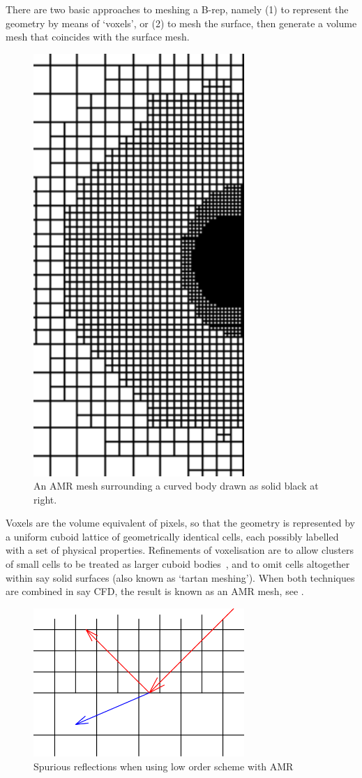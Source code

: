 There are two basic approaches to meshing a B-rep,
namely (1) to represent the geometry by means of `voxels'\cite{Bu07Trea},
or (2) to mesh the surface, then generate a volume mesh that coincides with
the surface mesh.

\begin{figure}
\centerline{\includegraphics[width=8cm]{../png/amrmesh}}
\caption{An AMR mesh surrounding a curved body drawn as solid black at right.\label{fig:amr}}
\end{figure}
Voxels are the volume equivalent of pixels, so that the geometry
is represented by a uniform cuboid lattice of geometrically
identical cells, each possibly labelled with a set of physical properties.
Refinements of voxelisation are to allow
clusters of small cells to be treated as larger
cuboid bodies~\cite{Va05CTan}, and to omit cells altogether within say solid surfaces
(also known as `tartan meshing'). When both techniques are combined in say CFD,
the result is known as an AMR mesh, see .

\begin{figure}
\centerline{\includegraphics[width=8cm]{../png/iamr}}
\caption{Spurious reflections when using low order scheme with AMR\label{fig:amrefl}}
\end{figure}

